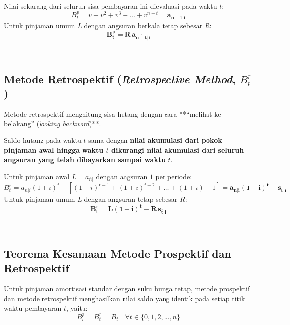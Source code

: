 \documentclass[11pt,a4paper]{article}
\begin{document}
Nilai sekarang dari seluruh sisa pembayaran ini dievaluasi pada waktu $t$:
\begin{equation}
    B_t^p = v + v^2 + v^3 + \dots + v^{n-t} = \mathbf{a_{\overline{n-t}|i}}
\end{equation}
Untuk pinjaman umum $L$ dengan angsuran berkala tetap sebesar $R$:
\begin{equation}
    \mathbf{B_t^p = R \, a_{\overline{n-t}|i}}
\end{equation}

---

\subsection{Metode Retrospektif (\textit{Retrospective Method}, \texorpdfstring{$B_t^r$}{B\_t\string^r})}

Metode retrospektif menghitung sisa hutang dengan cara **``melihat ke belakang'' (\textit{looking backward})**.
\begin{definitionbox}
Saldo hutang pada waktu $t$ sama dengan \textbf{nilai akumulasi dari pokok pinjaman awal hingga waktu $t$ dikurangi nilai akumulasi dari seluruh angsuran yang telah dibayarkan sampai waktu $t$}.
\end{definitionbox}

Untuk pinjaman awal $L = a_{\overline{n}|}$ dengan angsuran $1$ per periode:
\begin{equation}
    B_t^r = a_{\overline{n}|i} (1+i)^t - \left[ (1+i)^{t-1} + (1+i)^{t-2} + \dots + (1+i) + 1 \right] = \mathbf{a_{\overline{n}|i}(1+i)^t - s_{\overline{t}|i}}
\end{equation}
Untuk pinjaman umum $L$ dengan angsuran tetap sebesar $R$:
\begin{equation}
    \mathbf{B_t^r = L(1+i)^t - R \, s_{\overline{t}|i}}
\end{equation}

---

\subsection{Teorema Kesamaan Metode Prospektif dan Retrospektif}

\begin{theorembox}
Untuk pinjaman amortisasi standar dengan suku bunga tetap, metode prospektif dan metode retrospektif menghasilkan nilai saldo yang identik pada setiap titik waktu pembayaran $t$, yaitu:
\begin{equation}
    B_t^p = B_t^r = B_t \quad \forall t \in \{0, 1, 2, \dots, n\}
\end{equation}
\end{theorembox}
\end{document}
